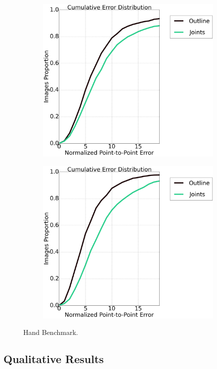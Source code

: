\begin{figure}[t!]
    \centering
    \begin{subfigure}[b]{0.23\textwidth}
            \includegraphics[width=\textwidth]{resources/HandBenchmark/elbow_joints}
    \end{subfigure}
    \hfill
    \begin{subfigure}[b]{0.23\textwidth}
            \includegraphics[width=\textwidth]{resources/HandBenchmark/wrist_joints}
    \end{subfigure}
    \caption{Hand Benchmark.}
    \label{fig:internal_benchmark}
\end{figure}


\subsection{Qualitative Results}
\label{exp:qualitative}
